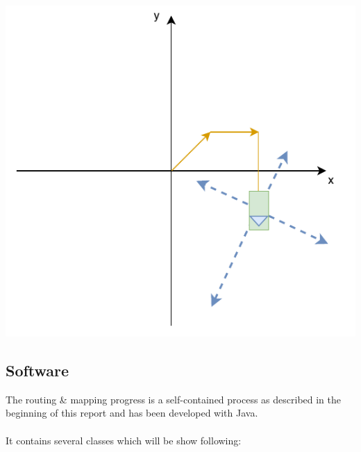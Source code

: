 \begin{center}
	\includegraphics[page=3,scale=0.6]{sources/mapping/orientation_objectdistance.pdf}
\end{center}

\newpage

\subsection{Software}

The routing \& mapping progress is a self-contained process as described in the beginning of this report and has been developed with Java.\\
\\
It contains several classes which will be show following:

